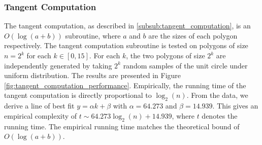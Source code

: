 \documentclass{article}
\newcommand{\figref}[1]{Figure \ref{#1}}
\begin{document}
\begin{figure}[h!]
    \begin{floatrow}
    \end{floatrow}
\end{figure}

\subsubsection{Tangent Computation}

The tangent computation, as described in \ref{subsub:tangent_computation}, is an $O(\log(a + b))$ subroutine, where $a$ and $b$ are the sizes of each polygon respectively. The tangent computation subroutine is tested on polygons of size $n = 2^k$ for each $k \in [0, 15]$. For each $k$, the two polygons of size $2^k$ are independently generated by taking $2^k$ random samples of the unit circle under uniform distribution. The results are presented in \figref{fig:tangent_computation_performance}. Empirically, the running time of the tangent computation is directly proportional to $\log_2(n)$. From the data, we derive a line of best fit $y = \alpha k + \beta$ with $\alpha = 64.273$ and $\beta = 14.939$. This gives an empirical complexity of $t \sim 64.273 \log_2 (n) + 14.939$, where $t$ denotes the running time. The empirical running time matches the theoretical bound of $O(\log(a+b))$.
\end{document}
